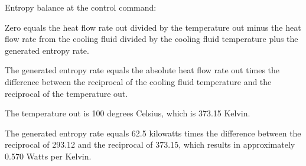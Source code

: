 Entropy balance at the control command:

Zero equals the heat flow rate out divided by the temperature out minus the heat flow rate from the cooling fluid divided by the cooling fluid temperature plus the generated entropy rate.

The generated entropy rate equals the absolute heat flow rate out times the difference between the reciprocal of the cooling fluid temperature and the reciprocal of the temperature out.

The temperature out is 100 degrees Celsius, which is 373.15 Kelvin.

The generated entropy rate equals 62.5 kilowatts times the difference between the reciprocal of 293.12 and the reciprocal of 373.15, which results in approximately 0.570 Watts per Kelvin.